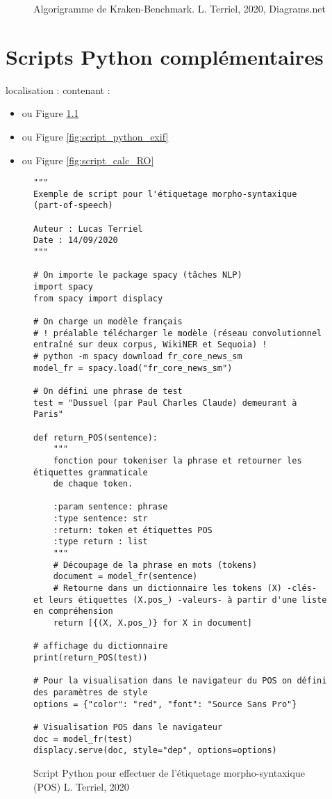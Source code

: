 \begin{figure}
    \centering
    \centerline{}
    \caption{Algorigramme de Kraken-Benchmark.   \textcopyright L. Terriel, 2020, Diagrams.net}
    \label{fig:algo-kb}
\end{figure}

\chapter{Scripts Python complémentaires}
localisation :  contenant :

\begin{itemize}
    \item {} ou Figure \ref{fig:script_python_POS}
    \item {} ou Figure \ref{fig:script_python_exif}
    \item {} ou Figure \ref{fig:script_calc_RO}
\end{itemize}

\begin{figure}[h]
\lstset{language=Python}
\begin{lstlisting}
"""
Exemple de script pour l'étiquetage morpho-syntaxique (part-of-speech)

Auteur : Lucas Terriel
Date : 14/09/2020
"""

# On importe le package spacy (tâches NLP)
import spacy
from spacy import displacy

# On charge un modèle français
# ! préalable télécharger le modèle (réseau convolutionnel entraîné sur deux corpus, WikiNER et Sequoia) !
# python -m spacy download fr_core_news_sm
model_fr = spacy.load("fr_core_news_sm")

# On défini une phrase de test
test = "Dussuel (par Paul Charles Claude) demeurant à Paris"

def return_POS(sentence):
    """
    fonction pour tokeniser la phrase et retourner les étiquettes grammaticale
    de chaque token.

    :param sentence: phrase
    :type sentence: str
    :return: token et étiquettes POS
    :type return : list
    """
    # Découpage de la phrase en mots (tokens)
    document = model_fr(sentence)
    # Retourne dans un dictionnaire les tokens (X) -clés- et leurs étiquettes (X.pos_) -valeurs- à partir d'une liste en compréhension
    return [{(X, X.pos_)} for X in document]

# affichage du dictionnaire
print(return_POS(test))

# Pour la visualisation dans le navigateur du POS on défini des paramètres de style
options = {"color": "red", "font": "Source Sans Pro"}

# Visualisation POS dans le navigateur
doc = model_fr(test)
displacy.serve(doc, style="dep", options=options)

\end{lstlisting}
\caption{Script Python pour effectuer de l'étiquetage morpho-syntaxique (POS) \textcopyright L. Terriel, 2020}
\label{fig:script_python_POS}
\end{figure}


